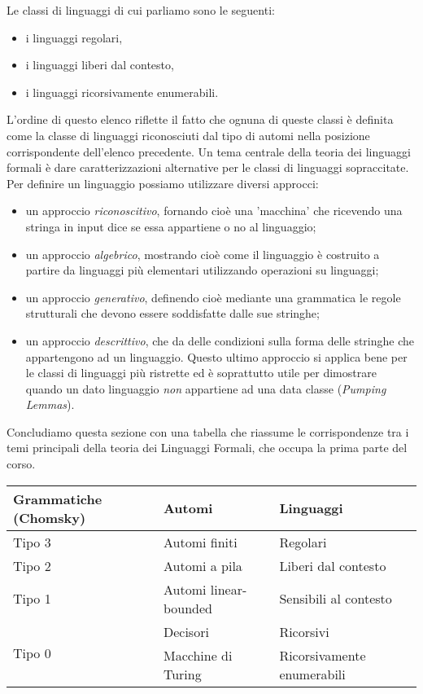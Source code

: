 \documentclass[runningheads,a4paper]{llncs}
\begin{document}
Le classi di linguaggi di cui parliamo sono le seguenti:
\begin{itemize}
  \item i linguaggi regolari,
  \item i linguaggi liberi dal contesto,
  \item i linguaggi ricorsivamente enumerabili.
\end{itemize}
L'ordine di questo elenco riflette il fatto che ognuna di queste classi \`{e} definita come la classe di linguaggi riconosciuti dal tipo di automi nella posizione corrispondente dell'elenco precedente. Un tema centrale della teoria dei linguaggi formali \`{e} dare caratterizzazioni alternative per le classi di linguaggi sopraccitate. Per definire un linguaggio possiamo utilizzare diversi approcci: 
\begin{itemize}
\item un approccio \emph{riconoscitivo}, fornando cio\`{e} una 'macchina' che ricevendo una stringa in input dice se essa appartiene o no al linguaggio;
\item un approccio \emph{algebrico}, mostrando cio\`{e} come il linguaggio \`{e} costruito a partire da linguaggi pi\`{u} elementari utilizzando operazioni su linguaggi;
\item un approccio \emph{generativo}, definendo cio\`{e} mediante una grammatica le regole strutturali che devono essere soddisfatte dalle sue stringhe;
\item un approccio \emph{descrittivo}, che da delle condizioni sulla forma delle stringhe che appartengono ad un linguaggio. Questo ultimo approccio si applica bene per le classi di linguaggi pi\`{u} ristrette ed \`{e} soprattutto utile per dimostrare quando un dato linguaggio \emph{non} appartiene ad una data classe (\emph{Pumping Lemmas}).
\end{itemize}

Concludiamo questa sezione con una tabella che riassume le corrispondenze tra i temi principali della teoria dei Linguaggi Formali, che occupa la prima parte del corso. \\

\begin{tabular}{|l|l|l|}
\hline
\textbf{Grammatiche (Chomsky)} & \textbf{Automi} & \textbf{Linguaggi} \\ 
\hline
Tipo 3 & Automi finiti & Regolari \\
\hline
Tipo 2 & Automi a pila & Liberi dal contesto \\
\hline
Tipo 1 & Automi linear-bounded & Sensibili al contesto \\
\hline
\multirow{2}{*}{Tipo 0} & Decisori & Ricorsivi \\
                                & Macchine di Turing & Ricorsivamente enumerabili \\
\hline
\end{tabular}
\end{document}
